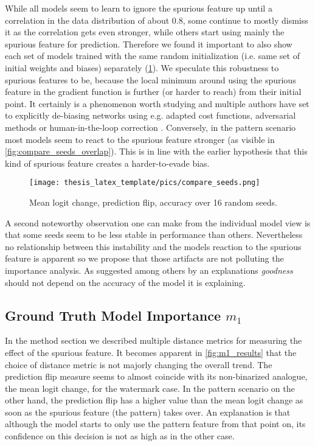 While all models seem to learn to ignore the spurious feature up until a correlation in the data distribution of about 0.8, some continue to mostly dismiss it as the correlation gets even stronger, while others start using mainly the spurious feature for prediction. Therefore we found it important to also show each set of models trained with the same random initialization (i.e. same set of initial weights and biases) separately (\cref{fig:gt_over_seeds}). We speculate this robustness to spurious features to be, because the local minimum around using the spurious feature in the gradient function is further (or harder to reach) from their initial point. It certainly is a phenomenon worth studying and multiple authors have set to explicitly de-biasing networks using e.g. adapted cost functions, adversarial methods or human-in-the-loop correction \citep{Anders2022,Pahde2023,Reimers2021, Reimers2021b, Dreyer2023a}.
Conversely, in the pattern scenario most models seem to react to the spurious feature stronger (as visible in \cref{fig:compare_seeds_overlap}). This is in line with the earlier hypothesis that this kind of spurious feature creates a harder-to-evade bias.  

\begin{figure}[t!]
    \centering
    \texttt{[image: thesis\_latex\_template/pics/compare\_seeds.png]}
    \caption[Comparing Seeds]{Mean logit change, prediction flip, accuracy over 16 random seeds.
    }
    \label{fig:gt_over_seeds}
\end{figure}

A second noteworthy observation one can make from the individual model view is that some seeds seem to be less stable in performance than others. Nevertheless no relationship between this instability and the models reaction to the spurious feature is apparent so we propose that those artifacts are not polluting the importance analysis. As suggested among others by \citet{Karimi2023} an explanations \textit{goodness} should not depend on the accuracy of the model it is explaining. 

\subsection{Ground Truth Model Importance $m_1$}
In the method section we described multiple distance metrics for measuring the effect of the spurious feature. It becomes apparent in \cref{fig:m1_results} that the choice of distance metric is not majorly changing the overall trend.
The prediction flip measure seems to almost coincide with its non-binarized analogue, the mean logit change, for the watermark case.
In the pattern scenario on the other hand, the prediction flip has a higher value than the mean logit change as soon as the spurious feature (the pattern) takes over. An explanation is that although the model starts to only use the pattern feature from that point on, its confidence on this decision is not as high as in the other case.

